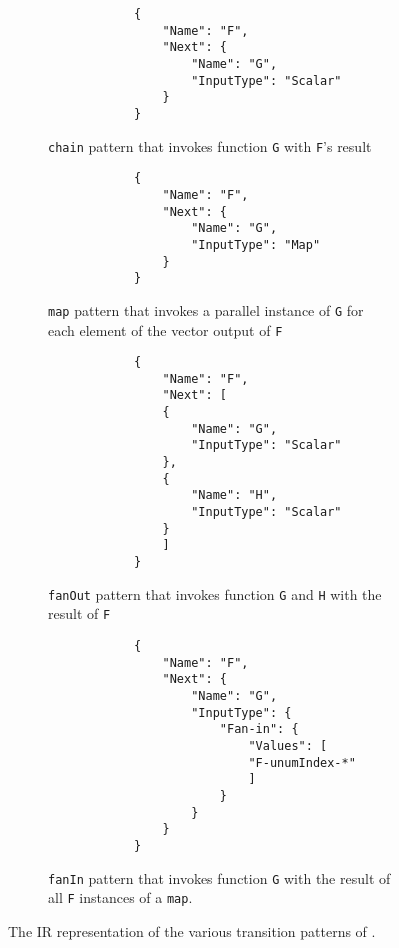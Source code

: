 \begin{figure*}[t!]
	\centering
	\begin{subfigure}[t]{\columnwidth}
		\centering
		\begin{verbatim}
			{
				"Name": "F",
				"Next": {
					"Name": "G",
					"InputType": "Scalar"
				}
			}
		\end{verbatim}
		\caption{\texttt{chain} pattern that invokes function \texttt{G} with
			\texttt{F}'s result}
		\label{fig:gadget-examples-chain}
	\end{subfigure}
	\begin{subfigure}[t]{\columnwidth}
		\centering
		\begin{verbatim}
			{
				"Name": "F",
				"Next": {
					"Name": "G",
					"InputType": "Map"
				}
			}
		\end{verbatim}
		\caption{\texttt{map} pattern that invokes a parallel instance of
			\texttt{G} for each element of the vector output of \texttt{F}}
		\label{fig:gadget-examples-map}
	\end{subfigure}
	\hfill
	\begin{subfigure}[t]{\columnwidth}
		\centering
		\begin{verbatim}
			{
				"Name": "F",
				"Next": [
				{
					"Name": "G",
					"InputType": "Scalar"
				},
				{
					"Name": "H",
					"InputType": "Scalar"
				}
				]
			}
		\end{verbatim}
		\caption{\texttt{fanOut} pattern that invokes function \texttt{G} and
			\texttt{H} with the result of \texttt{F}}
		\label{fig:gadget-examples-fanout}
	\end{subfigure}
	\begin{subfigure}[t]{\columnwidth}
		\centering
		\begin{verbatim}
			{
				"Name": "F",
				"Next": {
					"Name": "G",
					"InputType": {
						"Fan-in": {
							"Values": [
							"F-unumIndex-*"
							]
						}
					}
				}
			}
		\end{verbatim}
		\caption{\texttt{fanIn} pattern that invokes function \texttt{G} with
			the result of all \texttt{F} instances of a \texttt{map}.}
		\label{fig:gadget-examples-fanin}
	\end{subfigure}
	\caption{The IR representation of the various transition patterns of \name{} . }
	\label{fig:arch2}
\end{figure*}

